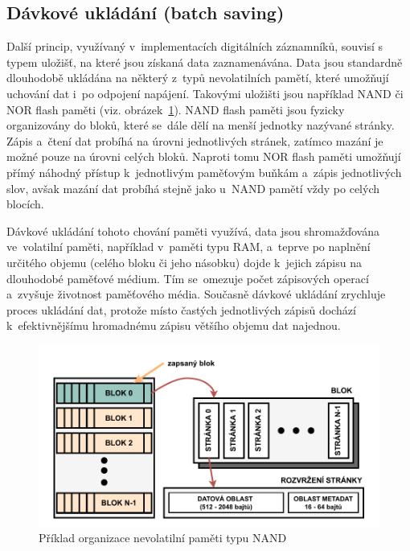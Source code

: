 \newpage


\subsection{Dávkové ukládání (batch saving)}
\label{davkove_zpracovani}
Další princip, využívaný v~implementacích digitálních záznamníků, souvisí s typem uložišť, na které jsou získaná data zaznamenávána. Data jsou standardně dlouhodobě ukládána na některý z~typů nevolatilních pamětí, které umožňují uchování dat i~po odpojení napájení. Takovými uložišti jsou například NAND či NOR flash paměti (viz. obrázek~\ref{fig:batch-processing}). NAND flash paměti jsou fyzicky organizovány do bloků, které se~dále dělí na menší jednotky nazývané stránky. Zápis a~čtení dat probíhá na úrovni jednotlivých stránek, zatímco mazání je možné pouze na úrovni celých bloků.  Naproti tomu NOR flash paměti umožňují přímý náhodný přístup k~jednotlivým paměťovým buňkám a~zápis jednotlivých slov, avšak mazání dat probíhá stejně jako u~NAND pamětí vždy po celých blocích.~\cite{non_volatile_memories, ieee_relationships_among_region_segment_frame_and_cluster}

Dávkové ukládání tohoto chování paměti využívá, data jsou shromažďována ve~volatilní paměti, například v~paměti typu RAM, a~teprve po naplnění určitého objemu (celého bloku či jeho násobku) dojde k~jejich zápisu na dlouhodobé paměťové médium. Tím se~omezuje počet zápisových operací a~zvyšuje životnost paměťového média. Současně dávkové ukládání zrychluje proces ukládání dat, protože místo častých jednotlivých zápisů dochází k~efektivnějšímu hromadnému zápisu většího objemu dat najednou.~\cite{non_volatile_memories, ieee_digital_sound_recorder_arm_sd_card, ieee_relationships_among_region_segment_frame_and_cluster}

\begin{figure}[h]
    \centering
    \includegraphics[width=1.00\textwidth]{obrazky-figures/nand-architecture-1.pdf}
    
    \caption{Příklad organizace nevolatilní paměti typu NAND~\cite{ieee_relationships_among_region_segment_frame_and_cluster}}
    \label{fig:batch-processing}
\end{figure}

